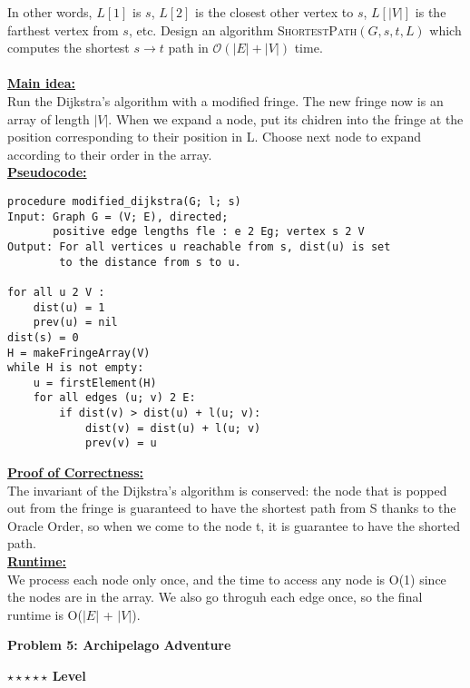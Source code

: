 \documentclass{article}\usepackage[utf8]{inputenc}
\begin{document}
\vspace{3pt}
\noindent In other words, $L[1]$ is $s$, $L[2]$ is the closest other vertex to $s$, $L[|V|]$ is the farthest vertex from $s$, etc. Design  an algorithm \textsc{ShortestPath}$(G,s,t,L)$ which computes the shortest $s\to t$ path in $\mathcal{O}(|E|+|V|)$ time.
\\
\BeginSolution %
\\
\underline{\textbf{Main idea:}}\\
Run the Dijkstra's algorithm with a modified fringe. The new fringe now is an array of length $|V|$. When we expand a node, put its chidren into the fringe at the position corresponding to their position in L. Choose next node to expand according to their order in the array.\\
\underline{\textbf{Pseudocode:}}\\
%
\begin{lstlisting}
procedure modified_dijkstra(G; l; s)
Input: Graph G = (V; E), directed;
       positive edge lengths fle : e 2 Eg; vertex s 2 V
Output: For all vertices u reachable from s, dist(u) is set
        to the distance from s to u.
        
for all u 2 V :
	dist(u) = 1
	prev(u) = nil
dist(s) = 0
H = makeFringeArray(V)
while H is not empty:
	u = firstElement(H)
	for all edges (u; v) 2 E:
		if dist(v) > dist(u) + l(u; v):
			dist(v) = dist(u) + l(u; v)
			prev(v) = u
\end{lstlisting}
%
\underline{\textbf{Proof of Correctness:}}\\
The invariant of the Dijkstra's algorithm is conserved: the node that is popped out from the fringe is guaranteed to have the shortest path from S thanks to the Oracle Order, so when we come to the node t, it is guarantee to have the shorted path.\\
\underline{\textbf{Runtime:}}\\
We process each node only once, and the time to access any node is O(1) since the nodes are in the array. We also go throguh each edge once, so the final runtime is O($|E|$ + $|V|$). 

\EndSolution
\clearpage

\vspace{-2mm}\noindent\begin{mybox}{\begin{center}\textbf{\color{black}Problem 5: Archipelago Adventure}\end{center}}\end{mybox}\vspace{-2mm}
\begin{myboxot}\noindent\textbf{$\star\star\star\star\star$ Level}\end{myboxot} 
\end{document}
